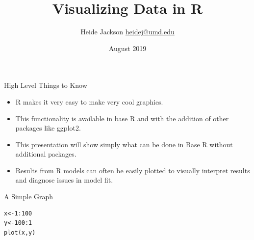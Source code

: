 \documentclass{beamer}
\title{Visualizing Data in R}
\author{\texorpdfstring{Heide Jackson \newline\url{heidej@umd.edu}}{Author}}
\institute{University of Maryland Population Research Center}
\date{August 2019}
\begin{document}
\maketitle
\begin{frame}{High Level Things to Know}
\begin{itemize}
\item R makes it very easy to make very cool graphics.
\item This functionality is available in base R and with the addition of other packages like ggplot2.
\item This presentation will show simply what can be done in Base R without additional packages.
\item Results from R models can often be easily plotted to visually interpret results and diagnose issues in model fit.
\end{itemize}
\end{frame}


\begin{frame}[fragile]{A Simple Graph}
\begin{verbatim}
x<-1:100
y<-100:1
plot(x,y)
\end{verbatim}
\end{frame}
\end{document}

